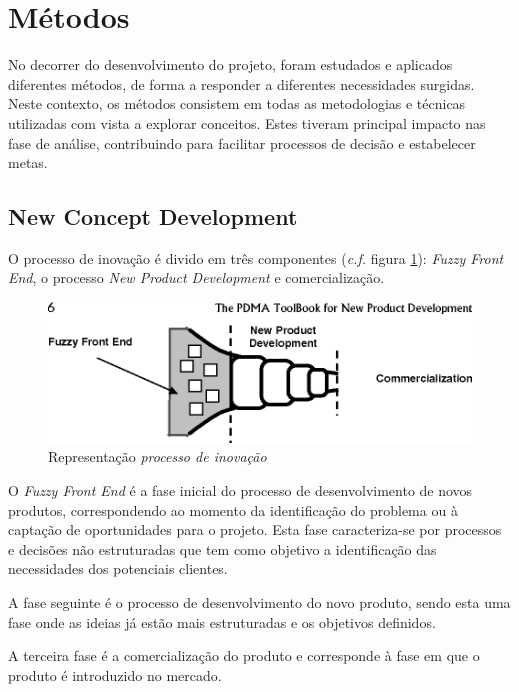 \section{Métodos}
No decorrer do desenvolvimento do projeto, foram estudados e aplicados diferentes métodos, de forma a responder a diferentes necessidades surgidas. Neste contexto, os métodos consistem em todas as metodologias e técnicas utilizadas com vista a explorar conceitos. Estes tiveram principal impacto nas fase de análise, contribuindo para facilitar processos de decisão e estabelecer metas.

\subsection{New Concept Development}
O processo de inovação é divido em três componentes (\emph{c.f.} figura \ref{figura_processo_inovacao}): \emph{Fuzzy
Front End}, o processo \emph{New Product Development} e comercialização\cite{fuzzy_frontend}.

\begin{figure}[H]
    \begin{center}
    \includegraphics[width=1\textwidth]{figures/new_product_development.png}
    \caption{Representação \emph{processo de inovação}}
    \label{figura_processo_inovacao}
    \end{center}
\end{figure}

O \emph{Fuzzy Front End} é a fase inicial do processo de desenvolvimento de novos produtos, correspondendo ao momento da identificação do problema ou à captação de oportunidades para o
projeto. Esta fase caracteriza-se por processos e decisões não estruturadas que tem como objetivo a identificação das necessidades dos potenciais clientes. 

A fase seguinte é o processo de  desenvolvimento do novo produto, sendo esta uma fase onde as ideias já estão mais estruturadas e os objetivos definidos. 

A terceira fase é a comercialização do produto e corresponde à fase em que o produto é introduzido no mercado\cite{fuzzy_frontend}.

